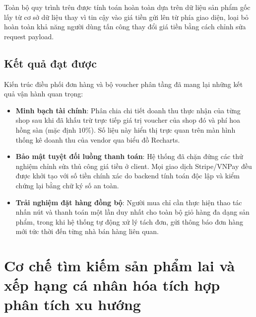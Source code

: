 \documentclass[../DoAn.tex]{subfiles}
\begin{document}
Toàn bộ quy trình trên được tính toán hoàn toàn dựa trên dữ liệu sản phẩm gốc lấy từ cơ sở dữ liệu thay vì tin cậy vào giá tiền gửi lên từ phía giao diện, loại bỏ hoàn toàn khả năng người dùng tấn công thay đổi giá tiền bằng cách chỉnh sửa request payload.

\subsection{Kết quả đạt được}
Kiến trúc điều phối đơn hàng và bộ voucher phân tầng đã mang lại những kết quả vận hành quan trọng:
\begin{itemize}
    \item \textbf{Minh bạch tài chính}: Phân chia chi tiết doanh thu thực nhận của từng shop sau khi đã khấu trừ trực tiếp giá trị voucher của shop đó và phí hoa hồng sàn (mặc định $10\%$). Số liệu này hiển thị trực quan trên màn hình thống kê doanh thu của vendor qua biểu đồ Recharts.
    \item \textbf{Bảo mật tuyệt đối luồng thanh toán}: Hệ thống đã chặn đứng các thử nghiệm chỉnh sửa thủ công giá tiền ở client. Mọi giao dịch Stripe/VNPay đều được khởi tạo với số tiền chính xác do backend tính toán độc lập và kiểm chứng lại bằng chữ ký số an toàn.
    \item \textbf{Trải nghiệm đặt hàng đồng bộ}: Người mua chỉ cần thực hiện thao tác nhấn nút và thanh toán một lần duy nhất cho toàn bộ giỏ hàng đa dạng sản phẩm, trong khi hệ thống tự động xử lý tách đơn, gửi thông báo đơn hàng mới tức thời đến từng nhà bán hàng liên quan.
\end{itemize}

\section{Cơ chế tìm kiếm sản phẩm lai và xếp hạng cá nhân hóa tích hợp phân tích xu hướng}
\label{section:5.4}
\end{document}
